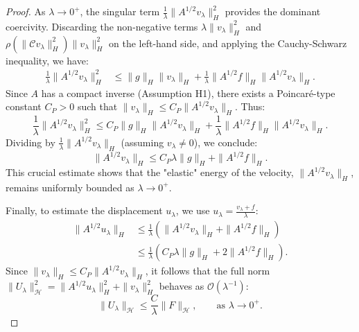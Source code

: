 \documentclass[10pt,a4paper]{amsart}
\begin{document}
\begin{proof}
As $\lambda \to 0^+$, the singular term $\frac{1}{\lambda} \|A^{1/2} v_\lambda\|_H^2$ provides the dominant coercivity. Discarding the non-negative terms $\lambda \|v_\lambda\|_H^2$ and $\rho(\|\mathcal C v_\lambda\|_H^2) \|v_\lambda\|_H^2$ on the left-hand side, and applying the Cauchy-Schwarz inequality, we have:
\begin{align*}
\frac{1}{\lambda} \|A^{1/2} v_\lambda\|_H^2 &\le \|g\|_H \|v_\lambda\|_H + \frac{1}{\lambda} \|A^{1/2} f\|_H \|A^{1/2} v_\lambda\|_H.
\end{align*}
Since $A$ has a compact inverse (Assumption H1), there exists a Poincaré-type constant $C_P > 0$ such that $\|v_\lambda\|_H \le C_P \|A^{1/2} v_\lambda\|_H$. Thus:
\begin{equation}
\frac{1}{\lambda} \|A^{1/2} v_\lambda\|_H^2 \le C_P \|g\|_H \|A^{1/2} v_\lambda\|_H + \frac{1}{\lambda} \|A^{1/2} f\|_H \|A^{1/2} v_\lambda\|_H.
\end{equation}
Dividing by $\frac{1}{\lambda} \|A^{1/2} v_\lambda\|_H$ (assuming $v_\lambda \neq 0$), we conclude:
\begin{equation}
\|A^{1/2} v_\lambda\|_H \le C_P \lambda \|g\|_H + \|A^{1/2} f\|_H.
\end{equation}
This crucial estimate shows that the "elastic" energy of the velocity, $\|A^{1/2} v_\lambda\|_H$, remains uniformly bounded as $\lambda \to 0^+$.

Finally, to estimate the displacement $u_\lambda$, we use $u_\lambda = \frac{v_\lambda + f}{\lambda}$:
\begin{align*}
\|A^{1/2} u_\lambda\|_H &\le \frac{1}{\lambda} \left( \|A^{1/2} v_\lambda\|_H + \|A^{1/2} f\|_H \right) \\
&\le \frac{1}{\lambda} \left( C_P \lambda \|g\|_H + 2\|A^{1/2} f\|_H \right).
\end{align*}
Since $\|v_\lambda\|_H \le C_P \|A^{1/2} v_\lambda\|_H$, it follows that the full norm $\|U_\lambda\|_{\mathcal{H}}^2 = \|A^{1/2} u_\lambda\|_H^2 + \|v_\lambda\|_H^2$ behaves as $\mathcal{O}(\lambda^{-1})$:
\begin{equation}
\|U_\lambda\|_{\mathcal H} \le \frac{C}{\lambda} \|F\|_{\mathcal H}, \qquad \text{as } \lambda \to 0^+.
\end{equation}
\end{proof}
\end{document}

